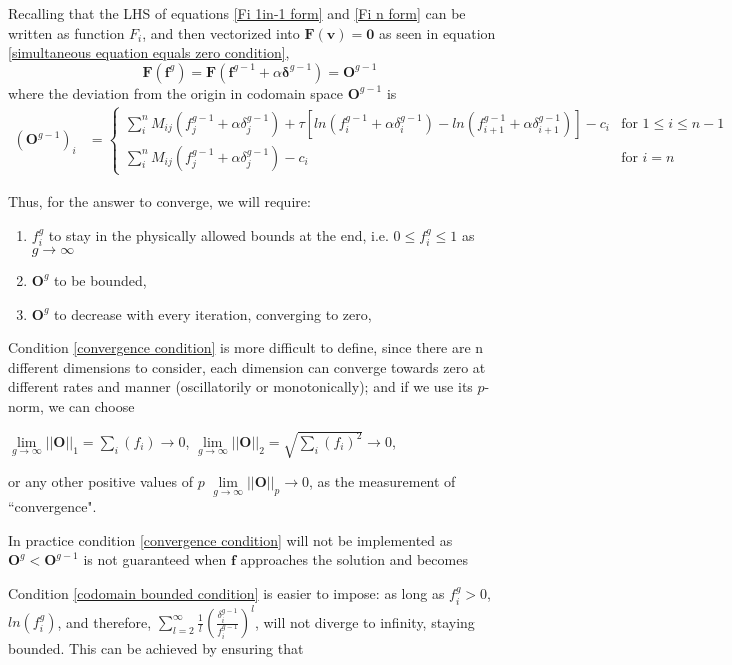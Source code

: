 \documentclass[a4paper, 12pt]{article}
\newcommand{\ve}[1]{\boldsymbol{#1}}
\begin{document}
Recalling that the LHS of equations \ref{Fi 1in-1 form} and \ref{Fi n form} can be written as function $F_i$, and then vectorized into $\ve{F}(\ve{v}) = \ve{0}$ as seen in equation \ref{simultaneous equation equals zero condition},
\begin{equation}
    \ve{F}(\ve{f}^{g}) = \ve{F}(\ve{f}^{g-1}+\alpha \ve{\delta}^{g-1}) = \ve{O}^{g-1}
\end{equation}
where the deviation from the origin in codomain space $\ve{O}^{g-1}$ is
\begin{align}
    (\ve{O}^{g-1})_i &=
\begin{cases}
        \sum\limits_i^n M_{ij}(f^{g-1}_j + \alpha \delta^{g-1}_j)+\tau[ln(f^{g-1}_i + \alpha\delta^{g-1}_i)-ln(f^{g-1}_{i+1} + \alpha\delta^{g-1}_{i+1})] -c_i
        &\text{for } 1\le i\le n-1
        \\
        \sum\limits_i^n M_{ij}(f^{g-1}_j + \alpha \delta^{g-1}_j)-c_i &\text{for } i=n
\end{cases}
\end{align}

Thus, for the answer to converge, we will require:
\begin{enumerate}
    \item $f^g_i$ to stay in the physically allowed bounds at the end, i.e. $0\le f^g_i\le1$ as $g\to\infty$ \label{domain bounded condition}
    \item $\ve{O}^g$ to be bounded, \label{codomain bounded condition}
    \item $\ve{O}^g$ to decrease with every iteration, converging to zero, \label{convergence condition}
\end{enumerate}
Condition \ref{convergence condition} is more difficult to define, since there are n different dimensions to consider, each dimension can converge towards zero at different rates and manner (oscillatorily or monotonically); and if we use its $p$-norm, we can choose

$\lim\limits_{g\to\infty}||\ve{O}||_1 = \sum\limits_i(f_i)\to 0$,
$\lim\limits_{g\to\infty}||\ve{O}||_2 = \sqrt{\sum\limits_i (f_i)^2}\to 0$,

or any other positive values of $p$ $\lim\limits_{g\to\infty}||\ve{O}||_p \to 0$, as the measurement of ``convergence".

In practice condition \ref{convergence condition} will not be implemented as $\ve{O}^g<\ve{O}^{g-1}$ is not guaranteed when $\ve{f}$ approaches the solution and becomes 

Condition \ref{codomain bounded condition} is easier to impose:
as long as $f^g_i>0$, $ln(f^g_i)$, and therefore, $\sum\limits_{l=2}^\infty\frac{1}{l}(\frac{\delta^{g-1}_i}{f^{g-1}_i})^l$, will not diverge to infinity, staying bounded. This can be achieved by ensuring that 
    
\end{document}
